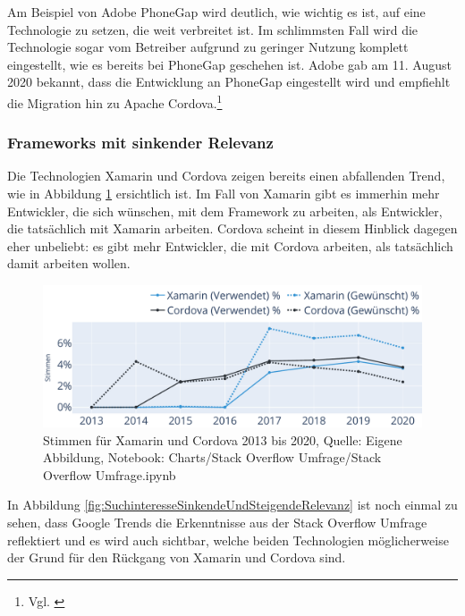 Am Beispiel von Adobe PhoneGap wird deutlich, wie wichtig es ist, auf eine Technologie zu setzen, die weit verbreitet ist. Im schlimmsten Fall wird die Technologie sogar vom Betreiber aufgrund zu geringer Nutzung komplett eingestellt, wie es bereits bei PhoneGap geschehen ist. Adobe gab am 11. August 2020 bekannt, dass die  Entwicklung an PhoneGap eingestellt wird und empfiehlt die Migration hin zu Apache Cordova.\footnote{Vgl. \cite{UpdateForCustomersUsingPhoneGapAndPhoneGapBuild}}

\subsubsection{Frameworks mit sinkender Relevanz}

Die Technologien Xamarin und Cordova zeigen bereits einen abfallenden Trend, wie in Abbildung \ref{fig:XamarinUndCordovaStimmen} ersichtlich ist. Im Fall von Xamarin gibt es immerhin mehr Entwickler, die sich wünschen, mit dem Framework zu arbeiten, als Entwickler, die tatsächlich mit Xamarin arbeiten. Cordova scheint in diesem Hinblick dagegen eher unbeliebt: es gibt mehr Entwickler, die mit Cordova arbeiten, als tatsächlich damit arbeiten wollen.

\begin{figure}[H]
	\centering
    \includegraphics[width=1.0\textwidth]{Charts/Stack Overflow Umfrage/Xamarin und Cordova Stimmen.pdf}
	\caption[Stimmen für Xamarin und Cordova]{Stimmen für Xamarin und Cordova 2013 bis 2020, Quelle: Eigene Abbildung, Notebook: Charts/Stack Overflow Umfrage/Stack Overflow Umfrage.ipynb}
	\label{fig:XamarinUndCordovaStimmen}
\end{figure}

In Abbildung \ref{fig:SuchinteresseSinkendeUndSteigendeRelevanz} ist noch einmal zu sehen, dass Google Trends die Erkenntnisse aus der Stack Overflow Umfrage reflektiert und es wird auch sichtbar, welche beiden Technologien möglicherweise der Grund für den Rückgang von Xamarin und Cordova sind.

